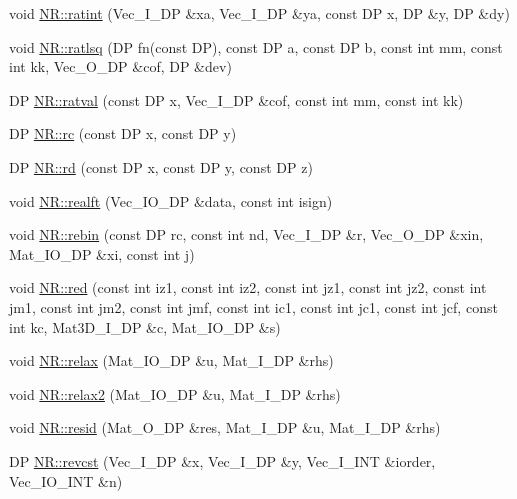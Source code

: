 \begin{DoxyCompactItemize}
\item 
void \mbox{\hyperlink{namespaceNR_acf23dccda6fe2ebd6630856bdb24a274}{N\+R\+::ratint}} (Vec\+\_\+\+I\+\_\+\+DP \&xa, Vec\+\_\+\+I\+\_\+\+DP \&ya, const DP x, DP \&y, DP \&dy)
\item 
void \mbox{\hyperlink{namespaceNR_a140701eacca3a2e031e077e8efc7794c}{N\+R\+::ratlsq}} (DP fn(const DP), const DP a, const DP b, const int mm, const int kk, Vec\+\_\+\+O\+\_\+\+DP \&cof, DP \&dev)
\item 
DP \mbox{\hyperlink{namespaceNR_a3acd42aca134502c65fb52c385218e33}{N\+R\+::ratval}} (const DP x, Vec\+\_\+\+I\+\_\+\+DP \&cof, const int mm, const int kk)
\item 
DP \mbox{\hyperlink{namespaceNR_a7d42c86df6be02b1e38a5bf9a51884d8}{N\+R\+::rc}} (const DP x, const DP y)
\item 
DP \mbox{\hyperlink{namespaceNR_a06e58a52a06276e59cdd77e651547f2c}{N\+R\+::rd}} (const DP x, const DP y, const DP z)
\item 
void \mbox{\hyperlink{namespaceNR_a6e6be7f8710c23ce1bba137a8b15ed43}{N\+R\+::realft}} (Vec\+\_\+\+I\+O\+\_\+\+DP \&data, const int isign)
\item 
void \mbox{\hyperlink{namespaceNR_a057f6d96cc5618a7d3b0d1a44a946a56}{N\+R\+::rebin}} (const DP rc, const int nd, Vec\+\_\+\+I\+\_\+\+DP \&r, Vec\+\_\+\+O\+\_\+\+DP \&xin, Mat\+\_\+\+I\+O\+\_\+\+DP \&xi, const int j)
\item 
void \mbox{\hyperlink{namespaceNR_a5d0fa7b2278cdceacefe8cd50705176f}{N\+R\+::red}} (const int iz1, const int iz2, const int jz1, const int jz2, const int jm1, const int jm2, const int jmf, const int ic1, const int jc1, const int jcf, const int kc, Mat3\+D\+\_\+\+I\+\_\+\+DP \&c, Mat\+\_\+\+I\+O\+\_\+\+DP \&s)
\item 
void \mbox{\hyperlink{namespaceNR_addb2b8e753b62caf1b43dd6f236c651a}{N\+R\+::relax}} (Mat\+\_\+\+I\+O\+\_\+\+DP \&u, Mat\+\_\+\+I\+\_\+\+DP \&rhs)
\item 
void \mbox{\hyperlink{namespaceNR_ab35ff057ba423e15b9661f578781f9fd}{N\+R\+::relax2}} (Mat\+\_\+\+I\+O\+\_\+\+DP \&u, Mat\+\_\+\+I\+\_\+\+DP \&rhs)
\item 
void \mbox{\hyperlink{namespaceNR_adc048600ca2f348d4250703a28fc2a76}{N\+R\+::resid}} (Mat\+\_\+\+O\+\_\+\+DP \&res, Mat\+\_\+\+I\+\_\+\+DP \&u, Mat\+\_\+\+I\+\_\+\+DP \&rhs)
\item 
DP \mbox{\hyperlink{namespaceNR_a8d1d9cdfaa0537971775ebcbe41a56eb}{N\+R\+::revcst}} (Vec\+\_\+\+I\+\_\+\+DP \&x, Vec\+\_\+\+I\+\_\+\+DP \&y, Vec\+\_\+\+I\+\_\+\+I\+NT \&iorder, Vec\+\_\+\+I\+O\+\_\+\+I\+NT \&n)

\end{DoxyCompactItemize}
